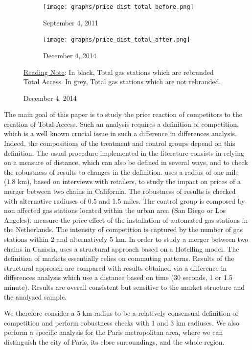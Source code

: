 \documentclass[english]{article}
\begin{document}
\begin{figure}[htb!]
\centering
\caption{Distributions of Total prices before and after rebranding}
\label{fig:price_dist_total_ba}
\begin{subfigure}{.49\textwidth}
\centering
\texttt{[image: graphs/price\_dist\_total\_before.png]}
\caption[short]{September 4, 2011}
\end{subfigure}
\begin{subfigure}{.49\textwidth}
\centering
\texttt{[image: graphs/price\_dist\_total\_after.png]}
\caption[short]{December 4, 2014}
\end{subfigure}
\flushleft
{\small{}\uline{Reading Note}}{\small{}: In black, Total gas stations which are rebranded Total Access. In grey, Total gas stations which are not rebranded.}{\small \par}
\end{figure}

The main goal of this paper is to study the price reaction of competitors to the creation of Total Access. Such an analysis requires a definition of competition, which is a well known crucial issue in such a difference in differences analysis. Indeed, the compositions of the treatment and control groups depend on this definition. The usual procedure implemented in the literature consists in relying on a measure of distance, which can also be defined in several ways, and to check the robustness of results to changes in the definition. \cite{HAS04} uses a radius of one mile (1.8 km), based on interviews with retailers, to study the impact on prices of a merger between two chains in California. The robustness of results is checked with alternative radiuses of 0.5 and 1.5 miles. The control group is composed by non affected gas stations located within the urban area (San Diego or Los Angeles). \cite{BRU15} measure the price effect of the installation of automated gas stations in the Netherlands. The intensity of competition is captured by the number of gas stations within 2 and alternatively 5 km. In order to study a merger between two chains in Canada, \cite{HOU12} uses a structural approach based on a Hotelling model. The definition of markets essentially relies on commuting patterns. Results of the structural approach are compared with results obtained via a difference in differences analysis which use a distance based on time (30 seconds, 1 or 1.5 minute). Results are overall consistent but sensitive to the market structure and the analyzed sample.

We therefore consider a 5 km radius to be a relatively consensual definition of competition and perform robustness checks with 1 and 3 km radiuses. We also perform a specific analysis for the Paris metropolitan area, where we can distinguish the city of Paris, its close surroundings, and the whole region.
\end{document}
